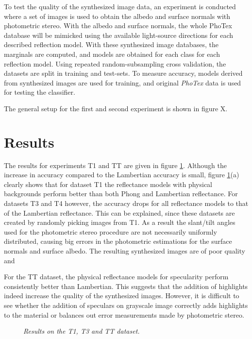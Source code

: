 To test the quality of the synthesized image data, an experiment is conducted where a set of images is used to obtain the albedo and surface normals with photometric stereo. With the albedo and surface normals, the whole PhoTex database will be mimicked using the available light-source directions for each described reflection model. With these synthesized image databases, the marginals are computed, and models are obtained for each class for each reflection model. Using repeated random-subsampling cross validation, the datasets are split in training and test-sets. To measure accuracy, models derived from synthesized images are used for training, and original {\it PhoTex} data is used for testing the classifier. 

The general setup for the first and second experiment is shown in figure X.

\section{Results}\label{sec:Results}
The results for experiments T1 and TT are given in figure \ref{fig:results_A}. Although the increase in accuracy compared to the Lambertian accuracy is small, figure \ref{fig:results_A}(a) clearly shows that for dataset T1 the reflectance models with physical backgrounds perform better than both Phong and Lambertian reflectance. For datasets T3 and T4 however, the accuracy drops for all reflectance models to that of the Lambertian reflectance. This can be explained, since these datasets are created by randomly picking images from T1. As a result the slant/tilt angles used for the photometric stereo procedure are not necessarily uniformly distributed, causing big errors in the photometric estimations for the surface normals and surface albedo. The resulting synthesized images are of poor quality and 

For the TT dataset, the physical reflectance models for specularity perform consistently better than Lambertian. This suggests that the addition of highlights indeed increase the quality of the synthesized images. However, it is difficult to see whether the addition of speculars on grayscale image correctly adds highlights to the material or balances out error measurements made by photometric stereo.

\begin{figure}[H]
	\begin{center}
	\end{center}
	\caption{{\it Results on the T1, T3 and TT dataset.}}
	\label{fig:results_A}
\end{figure}




